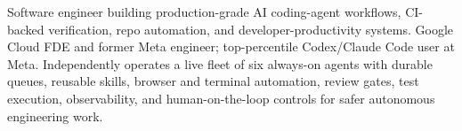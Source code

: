 


Software engineer building production-grade AI coding-agent workflows, CI-backed verification, repo automation, and developer-productivity systems. Google Cloud FDE and former Meta engineer; top-percentile Codex/Claude Code user at Meta. Independently operates a live fleet of six always-on agents with durable queues, reusable skills, browser and terminal automation, review gates, test execution, observability, and human-on-the-loop controls for safer autonomous engineering work.







